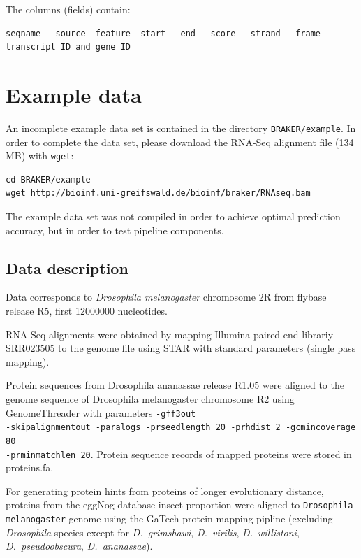 \documentclass[a4paper,10pt]{report}
\begin{document}
The columns (fields) contain: 

\begin{verbatim}
seqname   source  feature  start   end   score   strand   frame  transcript ID and gene ID
\end{verbatim}


\chapter{Example data}

An incomplete example data set is contained in the directory \texttt{BRAKER/example}. In order to complete the data set, please download the RNA-Seq alignment file (134 MB) with \texttt{wget}:

\begin{verbatim}
cd BRAKER/example
wget http://bioinf.uni-greifswald.de/bioinf/braker/RNAseq.bam
\end{verbatim}

The example data set was not compiled in order to achieve optimal prediction accuracy, but in order to test pipeline components.

\section{Data description}

Data corresponds to \textit{Drosophila melanogaster} chromosome 2R from flybase release R5, first 12000000 nucleotides.

RNA-Seq alignments were obtained by mapping Illumina paired-end librariy SRR023505 to the genome file using STAR with standard parameters (single pass mapping).

Protein sequences from Drosophila ananassae release R1.05 were aligned to the genome sequence of
Drosophila melanogaster chromosome R2 using GenomeThreader with parameters
\texttt{-gff3out \\-skipalignmentout -paralogs -prseedlength 20 -prhdist 2 -gcmincoverage 80 \\
-prminmatchlen 20}.
Protein sequence records of mapped proteins were stored in proteins.fa. 

For generating protein hints from proteins of longer evolutionary distance, proteins from the eggNog database insect proportion were aligned to \texttt{Drosophila melanogaster} genome using the GaTech protein mapping pipline (excluding \textit{Drosophila} species except for \textit{D.~grimshawi},
\textit{D.~virilis}, \textit{D.~willistoni}, \textit{D.~pseudoobscura}, \textit{D.~ananassae}).
\end{document}
